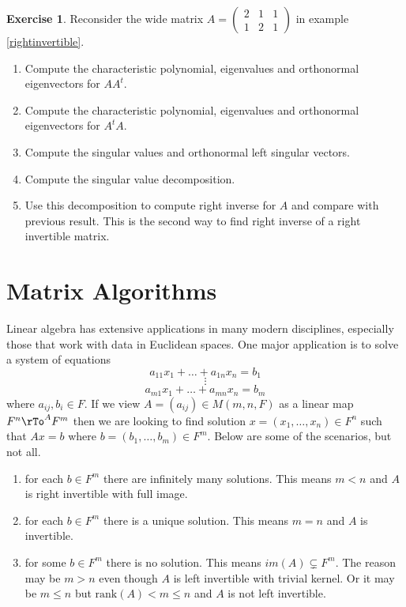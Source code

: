 \documentclass[12pt]{amsart}
\theoremstyle{definition}
\newtheorem{exercise}[theorem]{Exercise}
\begin{document}
\begin{exercise}\label{} Reconsider the wide matrix $A = \left(\begin{array}{ccc} 2 & 1 & 1 \\ 1 & 2 & 1 \end{array}\right)$ in example \ref{rightinvertible}.
\begin{enumerate}[\indent a.]
\item Compute the characteristic polynomial, eigenvalues and orthonormal eigenvectors for $AA^t$.
\item Compute the characteristic polynomial, eigenvalues and orthonormal eigenvectors for $A^tA$.
\item Compute the singular values and orthonormal left singular vectors.
\item Compute the singular value decomposition.
\item Use this decomposition to compute right inverse for $A$ and compare with previous result. This is the second way to find right inverse of a right invertible matrix.
\end{enumerate}
\end{exercise}

\part{Matrix Algorithms}\label{matrixalgorithms}  Linear algebra has extensive applications in many modern disciplines, especially those that work with data in Euclidean spaces. One major application is to solve a system of equations
$$a_{11}x_1 + \ldots + a_{1n}x_n = b_1$$
$$\vdots$$
$$a_{m1}x_1 + \ldots + a_{mn}x_n = b_m$$
where $a_{ij}, b_i \in F$. If we view $A = (a_{ij}) \in M(m, n,F)$ as a linear map $F^n \rTo^A F^m$ then we are looking to find solution $x = (x_1, \dots, x_n) \in F^n$ such that $Ax = b$ where $b = (b_1, \dots , b_m) \in F^m$. Below are some of the scenarios, but not all.
\begin{enumerate}[\indent i.]
\item for each $b \in F^m$ there are infinitely many solutions. This means $m < n$ and $A$ is right invertible with full image.
\item for each $b \in F^m$ there is a unique solution. This means $m = n$ and $A$ is invertible.
\item for some $b \in F^m$ there is no solution. This means $im(A) \subsetneq F^m$. The reason may be $m > n$ even though $A$ is left invertible with trivial kernel. Or it may be $m \leq n$ but $\text{rank}(A) < m \leq n$ and $A$ is not left invertible.
\end{enumerate}
\end{document}
